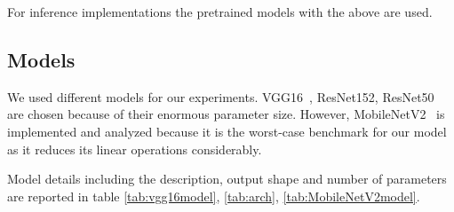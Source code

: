 \documentclass{article}
\begin{document}
For inference implementations the pretrained models with the above are used. 

\subsection*{Models}
We used different models for our experiments. VGG16~\citep{simonyan2014very}, ResNet152, ResNet50~\citep{he2016deep} are chosen because of their enormous parameter size. However, MobileNetV2~\citep{sandler2018mobilenetv2,howard2017mobilenets} is implemented and analyzed because it is the worst-case benchmark for our model as it reduces its linear operations considerably.

Model details including the description, output shape and number of parameters are reported in table \ref{tab:vgg16model}, \ref{tab:arch}, \ref{tab:MobileNetV2model}.
\end{document}
